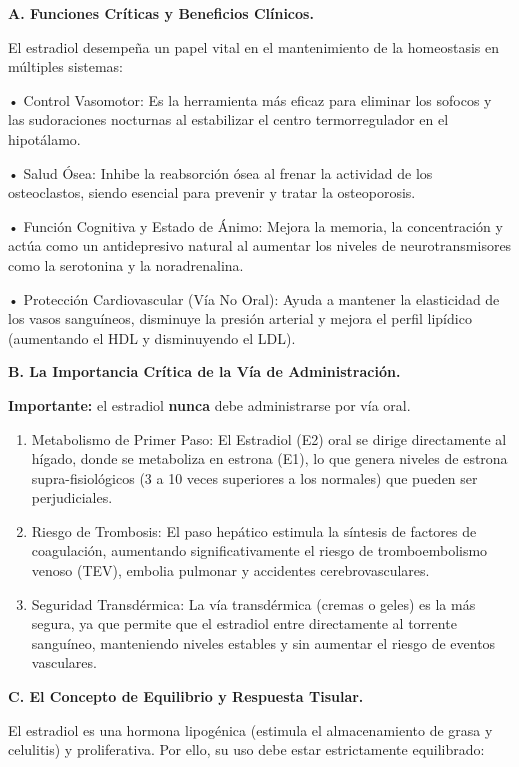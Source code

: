 \documentclass[
  spanish,
]{article}
\begin{document}
\textbf{A. Funciones Críticas y Beneficios Clínicos.}

El estradiol desempeña un papel vital en el mantenimiento de la homeostasis en múltiples sistemas:

• Control Vasomotor: Es la herramienta más eficaz para eliminar los sofocos y las sudoraciones nocturnas al estabilizar el centro termorregulador en el hipotálamo.

• Salud Ósea: Inhibe la reabsorción ósea al frenar la actividad de los osteoclastos, siendo esencial para prevenir y tratar la osteoporosis.

• Función Cognitiva y Estado de Ánimo: Mejora la memoria, la concentración y actúa como un antidepresivo natural al aumentar los niveles de neurotransmisores como la serotonina y la noradrenalina.

• Protección Cardiovascular (Vía No Oral): Ayuda a mantener la elasticidad de los vasos sanguíneos, disminuye la presión arterial y mejora el perfil lipídico (aumentando el HDL y disminuyendo el LDL).

\textbf{B. La Importancia Crítica de la Vía de Administración.}

\textbf{Importante:} el estradiol \textbf{nunca} debe administrarse por vía oral.

\begin{enumerate}
\def\labelenumi{\arabic{enumi}.}
\item
  Metabolismo de Primer Paso: El Estradiol (E2) oral se dirige directamente al hígado, donde se metaboliza en estrona (E1), lo que genera niveles de estrona supra-fisiológicos (3 a 10 veces superiores a los normales) que pueden ser perjudiciales.
\item
  Riesgo de Trombosis: El paso hepático estimula la síntesis de factores de coagulación, aumentando significativamente el riesgo de tromboembolismo venoso (TEV), embolia pulmonar y accidentes cerebrovasculares.
\item
  Seguridad Transdérmica: La vía transdérmica (cremas o geles) es la más segura, ya que permite que el estradiol entre directamente al torrente sanguíneo, manteniendo niveles estables y sin aumentar el riesgo de eventos vasculares.
\end{enumerate}

\textbf{C. El Concepto de Equilibrio y Respuesta Tisular.}

El estradiol es una hormona lipogénica (estimula el almacenamiento de grasa y celulitis) y proliferativa. Por ello, su uso debe estar estrictamente equilibrado:
\end{document}
